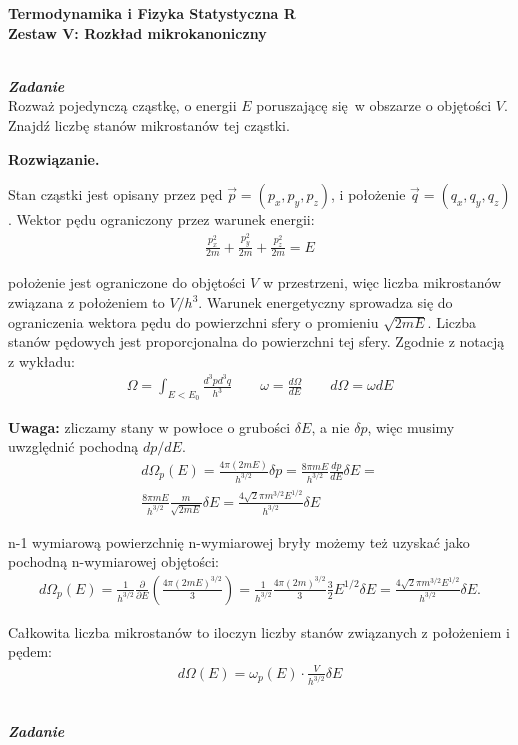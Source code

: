 \documentclass[11pt,a4paper]{article}
\newcounter{zadanie}\newcommand{\zadanie}[1][]{\addtocounter{zadanie}{1} ~\\  {\bf \emph{Zadanie \arabic{zadanie} #1 }} \\}
\newenvironment{solution}{\vspace{1cm} \par\textbf{Rozwiązanie.} \vspace{1cm}}{}
\begin{document}
   

\begin{centering}
  {\bf {\Large
  Termodynamika i Fizyka Statystyczna R \\
  Zestaw V: Rozkład mikrokanoniczny
  }} \\  
\end{centering}

\zadanie[]

Rozważ pojedynczą cząstkę, o energii $E$ poruszającę się w obszarze o objętości $V$.
Znajdź liczbę stanów mikrostanów tej cząstki.

\begin{solution}

Stan cząstki jest opisany przez  pęd $\vec{p} = (p_x, p_y, p_z)$,
i położenie $\vec{q} = (q_x, q_y, q_z)$.
Wektor pędu ograniczony przez warunek energii: 
\begin{align*}
\frac{p_x^2}{2m} + \frac{p_y^2}{2m} + \frac{p_z^2}{2m} = E
\end{align*}

położenie jest ograniczone do objętości $V$ w przestrzeni, więc liczba
mikrostanów związana z położeniem to $V/h^3$. Warunek energetyczny sprowadza 
się do ograniczenia wektora pędu do powierzchni sfery o promieniu $\sqrt{2mE}$. 
Liczba stanów pędowych jest proporcjonalna do powierzchni tej sfery.
Zgodnie z notacją z wykładu:
\begin{align*}
  \Omega = \int_{E<E_0} \frac{d^3p d^3q}{h^3} \qquad
  \omega = \frac{d\Omega}{dE} \qquad
  d\Omega = \omega dE
\end{align*}


{\bf Uwaga:} zliczamy stany w powłoce o grubości $\delta E$,
 a nie $\delta p$, więc musimy uwzględnić pochodną $dp/dE$.
\begin{align*}
d\Omega_{p}(E) = \frac{4\pi (2mE)}{h^{3/2}}\delta p = 
\frac{8\pi mE}{h^{3/2}} \frac{dp}{dE} \delta E = \\
\frac{8\pi mE}{h^{3/2}} \frac{m}{\sqrt{2mE}} \delta E = 
\frac{4\sqrt{2}\pi m^{3/2}E^{1/2}}{h^{3/2}}   \delta E
\end{align*}

n-1 wymiarową powierzchnię n-wymiarowej bryły możemy też uzyskać 
jako pochodną n-wymiarowej objętości:
\begin{align*}
d\Omega_{p}(E) = \frac{1}{h^{3/2}} \frac{\partial}{\partial E} \left( \frac{4\pi (2mE)^{3/2}}{3} \right) =
\frac{1}{h^{3/2}} \frac{4\pi (2m)^{3/2}}{3} \frac{3}{2} E^{1/2} \delta E = 
\frac{4 \sqrt{2}\pi m^{3/2} E^{1/2}}{h^{3/2}} \delta E.
\end{align*}

Całkowita liczba mikrostanów to iloczyn liczby stanów związanych z położeniem i pędem:
\begin{align*}
d\Omega(E) = \omega_{p}(E) \cdot \frac{V}{h^{3/2}} \delta E
\end{align*}

\newpage
\end{solution} 
\zadanie[]
\end{document}
